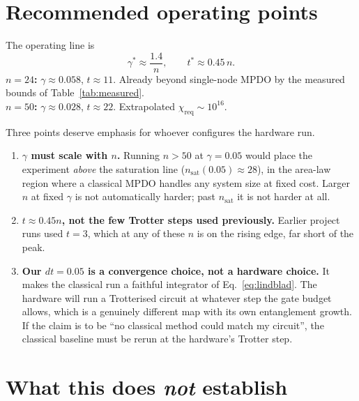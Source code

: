 \documentclass[11pt,a4paper]{article}
\newcommand{\chreq}{\chi_{\mathrm{req}}}
\newcommand{\nsat}{n_{\mathrm{sat}}}
\begin{document}
\section{Recommended operating points}
\label{sec:operating}

\begin{keybox}
The operating line is
\[
  \gamma^\ast \approx \frac{1.4}{n}, \qquad t^\ast \approx 0.45\,n .
\]
\textbf{$n=24$:} $\gamma\approx0.058$, $t\approx11$. Already beyond single-node
MPDO by the measured bounds of Table~\ref{tab:measured}.\\
\textbf{$n=50$:} $\gamma\approx0.028$, $t\approx22$. Extrapolated
$\chreq\sim10^{16}$.
\end{keybox}

Three points deserve emphasis for whoever configures the hardware run.

\begin{enumerate}[leftmargin=1.5em,itemsep=3pt]
\item \textbf{$\gamma$ must scale with $n$.} Running $n>50$ at $\gamma=0.05$
  would place the experiment \emph{above} the saturation line
  ($\nsat(0.05)\approx28$), in the area-law region where a classical MPDO
  handles any system size at fixed cost. Larger $n$ at fixed $\gamma$ is not
  automatically harder; past $\nsat$ it is not harder at all.
\item \textbf{$t\approx0.45n$, not the few Trotter steps used previously.}
  Earlier project runs used $t=3$, which at any of these $n$ is on the rising
  edge, far short of the peak.
\item \textbf{Our $dt=0.05$ is a convergence choice, not a hardware choice.} It
  makes the classical run a faithful integrator of Eq.~\eqref{eq:lindblad}. The
  hardware will run a Trotterised circuit at whatever step the gate budget
  allows, which is a genuinely different map with its own entanglement growth.
  If the claim is to be ``no classical method could match my circuit'', the
  classical baseline must be rerun at the hardware's Trotter step.
\end{enumerate}

\section{What this does \emph{not} establish}
\label{sec:limits}
\end{document}
